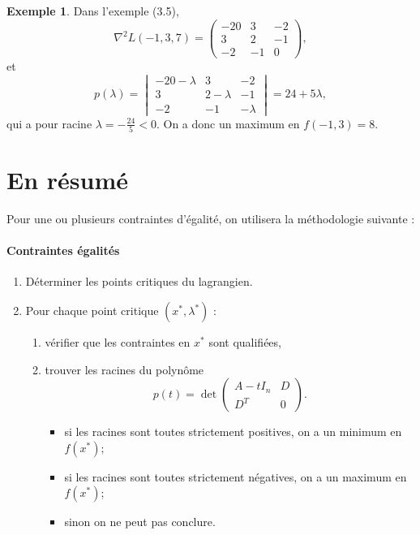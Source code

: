\documentclass[a4paper,12pt,openany]{book}
\theoremstyle{plain}
\theoremstyle{definition}
\newtheorem{example}[theorem]{Exemple}
\theoremstyle{remark}
\theoremstyle{nbstyle}
\begin{document}
	\begin{example}\label{ex:3.8}
		Dans l'exemple (3.5),
		\[
		\nabla^2 L(-1,3,7)=
		\begin{pmatrix}
		-20 & 3 & -2\\
		3 & 2 & -1\\
		-2 & -1 & 0
		\end{pmatrix},
		\]
		et
		\[
		p(\lambda)=
		\begin{vmatrix}
		-20-\lambda & 3 & -2\\[2pt]
		3 & 2-\lambda & -1\\[2pt]
		-2 & -1 & -\lambda
		\end{vmatrix}=24+5\lambda,
		\]
		qui a pour racine \(\lambda=-\tfrac{24}{5}<0\). On a donc un maximum en \(f(-1,3)=8\).
	\end{example}
	
	\section{En résumé}
	
	Pour une ou plusieurs contraintes d'égalité, on utilisera la méthodologie suivante :
	
	\paragraph{Contraintes égalités}
	\begin{enumerate}
		\item Déterminer les points critiques du lagrangien.
		\item Pour chaque point critique \((x^*,\lambda^*)\) :
		\begin{enumerate}
			\item vérifier que les contraintes en \(x^*\) sont qualifiées,
			\item trouver les racines du polynôme
			\[
			p(t)=\det\begin{pmatrix} A-tI_n & D \\ D^T & 0\end{pmatrix}.
			\]
			\begin{itemize}
				\item[i.] si les racines sont toutes strictement positives, on a un minimum en \(f(x^*)\);
				\item[ii.] si les racines sont toutes strictement négatives, on a un maximum en \(f(x^*)\);
				\item[iii.] sinon on ne peut pas conclure.
			\end{itemize}
		\end{enumerate}
	\end{enumerate}
	
\end{document}
